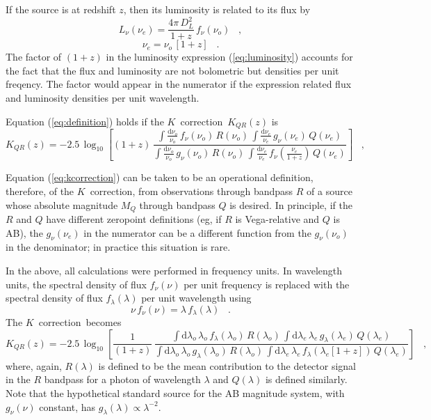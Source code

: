 \documentclass[preprint]{aastex}
\newcommand{\kcorrection}{$K$~correction}
\newcommand{\nuobs}{\nu_o}
\newcommand{\nuemit}{\nu_e}
\begin{document}
If the source is at redshift $z$, then its luminosity is related to
its flux by
\begin{equation}
\label{eq:luminosity}
L_{\nu}(\nuemit) = \frac{4\pi\,D_L^2}{1+z}\,f_{\nu}(\nuobs) \;\;\;,
\end{equation}
\begin{equation}
\nuemit = \nuobs\,[1+z] \;\;\;.
\end{equation}
The factor of $(1+z)$ in the luminosity expression
(\ref{eq:luminosity}) accounts for the fact that the flux and
luminosity are not bolometric but densities per unit freqency.  The
factor would appear in the numerator if the expression related flux
and luminosity densities per unit wavelength.

Equation (\ref{eq:definition}) holds if the \kcorrection\ $K_{QR}(z)$
is
\begin{equation}
\label{eq:kcorrection}
K_{QR}(z) = -2.5\,\log_{10}\left[(1+z)\,
  \frac{\displaystyle
          \int\frac{\mathrm{d}\nuobs}{\nuobs}\,f_{\nu}(\nuobs)\,R(\nuobs)\,
          \int\frac{\mathrm{d}\nuemit}{\nuemit}\,g_{\nu}(\nuemit)\,Q(\nuemit)}
       {\displaystyle
          \int\frac{\mathrm{d}\nuobs}{\nuobs}\,g_{\nu}(\nuobs)\,R(\nuobs)\,
          \int\frac{\mathrm{d}\nuemit}{\nuemit}\,
            f_{\nu}\left(\frac{\nuemit}{1+z}\right)\,Q(\nuemit)}
\right] \;\;\;,
\end{equation}

Equation (\ref{eq:kcorrection}) can be taken to be an operational
definition, therefore, of the \kcorrection, from observations through
bandpass $R$ of a source whose absolute magnitude $M_Q$ through
bandpass $Q$ is desired.  In principle, if the $R$ and $Q$ have
different zeropoint definitions (eg, if $R$ is Vega-relative and $Q$
is AB), the $g_{\nu}(\nuemit)$ in the numerator can be a different
function from the $g_{\nu}(\nuobs)$ in the denominator; in practice
this situation is rare.

In the above, all calculations were performed in frequency units.  In
wavelength units, the spectral density of flux $f_{\nu}(\nu)$ per unit
frequency is replaced with the spectral density of flux
$f_{\lambda}(\lambda)$ per unit wavelength using
\begin{equation}
\nu\,f_{\nu}(\nu) = \lambda\,f_{\lambda}(\lambda) \;\;\;.
\end{equation}
The \kcorrection\ becomes
\begin{equation}
K_{QR}(z) = -2.5\,\log_{10}\left[\frac{1}{(1+z)}\,
  \frac{\displaystyle
    \int\mathrm{d}\lambda_o\,\lambda_o\,f_{\lambda}(\lambda_o)\,R(\lambda_o)\,
      \int\mathrm{d}\lambda_e\,\lambda_e\,
      g_{\lambda}(\lambda_e)\,     Q(\lambda_e)}
       {\displaystyle
    \int\mathrm{d}\lambda_o\,\lambda_o\,g_{\lambda}(\lambda_o)\,R(\lambda_o)\,
      \int\mathrm{d}\lambda_e\,\lambda_e\,
      f_{\lambda}(\lambda_e[1+z])\,Q(\lambda_e)}
\right] \;\;\;,
\end{equation}
where, again, $R(\lambda)$ is defined to be the mean contribution to
the detector signal in the $R$ bandpass for a photon of wavelength
$\lambda$ and $Q(\lambda)$ is defined similarly.  Note that the
hypothetical standard source for the AB magnitude system, with
$g_{\nu}(\nu)$ constant, has
$g_{\lambda}(\lambda)\propto\lambda^{-2}$.
\end{document}
